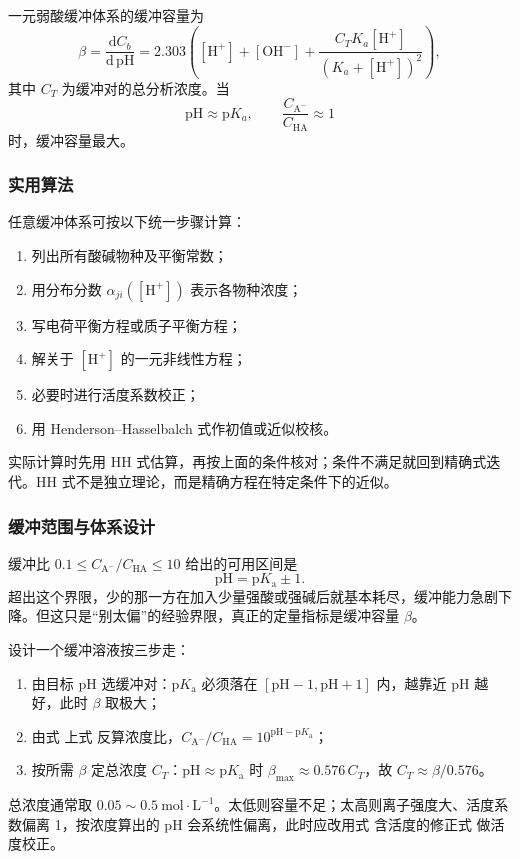 \documentclass[UTF8]{ctexbook}
\begin{document}
一元弱酸缓冲体系的缓冲容量为
\[
  \beta
  =
  \frac{\mathrm{d}C_b}{\mathrm{d}\,\mathrm{pH}}
  =
  2.303
  \left(
    [\mathrm{H^+}]
    +[\mathrm{OH^-}]
    +
    \frac{C_T K_a[\mathrm{H^+}]}
         {\left(K_a+[\mathrm{H^+}]\right)^2}
  \right),
\]
其中 \(C_T\) 为缓冲对的总分析浓度。当
\[
  \mathrm{pH}\approx \mathrm{p}K_a,
  \qquad
  \frac{C_{\mathrm{A^-}}}{C_{\mathrm{HA}}}\approx 1
\]
时，缓冲容量最大。

\subsubsection{实用算法}

任意缓冲体系可按以下统一步骤计算：
\begin{enumerate}
  \item 列出所有酸碱物种及平衡常数；
  \item 用分布分数 \(\alpha_{ji}([\mathrm{H^+}])\) 表示各物种浓度；
  \item 写电荷平衡方程或质子平衡方程；
  \item 解关于 \([\mathrm{H^+}]\) 的一元非线性方程；
  \item 必要时进行活度系数校正；
  \item 用 Henderson--Hasselbalch 式作初值或近似校核。
\end{enumerate}

实际计算时先用 HH 式估算，再按上面的条件核对；条件不满足就回到精确式迭代。HH 式不是独立理论，而是精确方程在特定条件下的近似。

\subsubsection{缓冲范围与体系设计}

缓冲比 $0.1\le C_{\mathrm{A^-}}/C_{\mathrm{HA}}\le10$ 给出的可用区间是
\[
\mathrm{pH}=\mathrm{p}K_{\mathrm{a}}\pm1 .
\]
超出这个界限，少的那一方在加入少量强酸或强碱后就基本耗尽，缓冲能力急剧下降。但这只是“别太偏”的经验界限，真正的定量指标是缓冲容量 $\beta$。

设计一个缓冲溶液按三步走：
\begin{enumerate}
  \item 由目标 $\mathrm{pH}$ 选缓冲对：$\mathrm{p}K_{\mathrm{a}}$ 必须落在 $[\mathrm{pH}-1,\mathrm{pH}+1]$ 内，越靠近 $\mathrm{pH}$ 越好，此时 $\beta$ 取极大；
  \item 由式 上式 反算浓度比，$C_{\mathrm{A^-}}/C_{\mathrm{HA}}=10^{\mathrm{pH}-\mathrm{p}K_{\mathrm{a}}}$；
  \item 按所需 $\beta$ 定总浓度 $C_T$：$\mathrm{pH}\approx\mathrm{p}K_{\mathrm{a}}$ 时 $\beta_{\max}\approx0.576\,C_T$，故 $C_T\approx\beta/0.576$。
\end{enumerate}
总浓度通常取 $0.05\sim0.5\ \mathrm{mol\cdot L^{-1}}$。太低则容量不足；太高则离子强度大、活度系数偏离 1，按浓度算出的 $\mathrm{pH}$ 会系统性偏离，此时应改用式 含活度的修正式 做活度校正。
\end{document}
